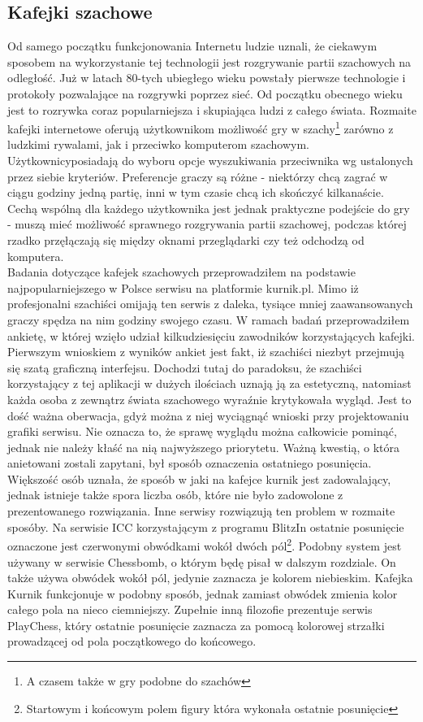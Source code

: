 \documentclass[12pt,leqno]{article}
\begin{document}
\subsection{Kafejki szachowe}
\indent  Od samego początku funkcjonowania Internetu ludzie uznali, że ciekawym sposobem na wykorzystanie tej technologii jest rozgrywanie partii szachowych na odległość. Już w latach 80-tych ubiegłego wieku powstały pierwsze technologie i protokoły pozwalające na rozgrywki poprzez sieć. Od początku obecnego wieku jest to rozrywka coraz popularniejsza i skupiająca ludzi z całego świata. Rozmaite kafejki internetowe oferują użytkownikom możliwość gry w szachy\footnote{A czasem także w gry podobne do szachów} zarówno z ludzkimi rywalami, jak i przeciwko komputerom szachowym. Użytkownicyposiadają do wyboru opcje wyszukiwania przeciwnika wg ustalonych przez siebie kryteriów. Preferencje graczy są różne - niektórzy chcą zagrać w ciągu godziny jedną partię, inni w tym czasie chcą ich skończyć kilkanaście. Cechą wspólną dla każdego użytkownika jest jednak praktyczne podejście do gry - muszą mieć możliwość sprawnego rozgrywania partii szachowej, podczas której rzadko przęłączają się między oknami przeglądarki czy też odchodzą od komputera. \\
\indent Badania dotyczące kafejek szachowych przeprowadziłem na podstawie najpopularniejszego w Polsce serwisu na platformie kurnik.pl. Mimo iż profesjonalni szachiści omijają ten serwis z daleka, tysiące mniej zaawansowanych graczy spędza na nim godziny swojego czasu. W ramach badań przeprowadziłem ankietę, w której wzięło udział kilkudziesięciu zawodników korzystających kafejki. Pierwszym wnioskiem z wyników ankiet jest fakt, iż szachiści niezbyt przejmują się szatą graficzną interfejsu. Dochodzi tutaj do paradoksu, że szachiści korzystający z tej aplikacji w dużych ilościach uznają ją za estetyczną, natomiast każda osoba z zewnątrz świata szachowego wyraźnie krytykowała wygląd.  Jest to dość ważna oberwacja, gdyż można z niej wyciągnąć wnioski przy projektowaniu grafiki serwisu. Nie oznacza to, że sprawę wyglądu można całkowicie pominąć, jednak nie należy kłaść na nią najwyższego priorytetu. Ważną kwestią, o która anietowani zostali zapytani, był sposób oznaczenia ostatniego posunięcia. Większość osób uznała, że sposób w jaki na kafejce kurnik jest zadowalający, jednak istnieje także spora liczba osób, które nie było zadowolone z prezentowanego rozwiązania. Inne serwisy rozwiązują ten problem w rozmaite sposóby. Na serwisie ICC korzystającym z programu BlitzIn ostatnie posunięcie oznaczone jest czerwonymi obwódkami wokół dwóch pól\footnote{Startowym i końcowym polem figury która wykonała ostatnie posunięcie}. Podobny system jest używany w serwisie Chessbomb, o którym będę pisał w dalszym rozdziale. On także używa obwódek wokół pól, jedynie zaznacza je kolorem niebieskim. Kafejka Kurnik funkcjonuje w podobny sposób, jednak zamiast obwódek zmienia kolor całego pola na nieco ciemniejszy. Zupełnie inną filozofie prezentuje serwis PlayChess, który ostatnie posunięcie zaznacza za pomocą kolorowej strzałki prowadzącej od pola początkowego do końcowego.\\ 
\end{document}
